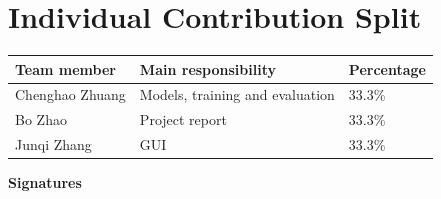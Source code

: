 \clearpage

\hypertarget{individual-contribution-split}{%
\section{Individual Contribution Split}\label{individual-contribution-split}}

\begin{longtable}[]{@{}lll@{}}
\toprule\noalign{}
Team member & Main responsibility & Percentage \\
\midrule\noalign{}
\endhead
\bottomrule\noalign{}
\endlastfoot
Chenghao Zhuang & Models, training and evaluation & 33.3\% \\
Bo Zhao & Project report & 33.3\% \\
Junqi Zhang & GUI & 33.3\% \\
\end{longtable}
\medskip
\noindent\textbf{Signatures}\par\medskip
{}
